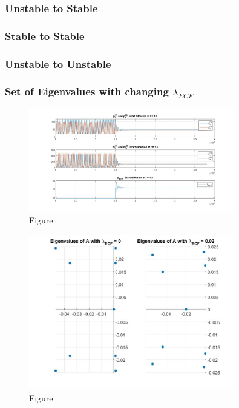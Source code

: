 \documentclass[12pt]{article}
\renewcommand{\(}{\left (}
\renewcommand{\)}{\right )}
\begin{document}
\subsubsection{Unstable to Stable}

\subsubsection{Stable to Stable}

\subsubsection{Unstable to Unstable}

\subsubsection{Set of Eigenvalues with changing $\lambda_{ECF}$}

\begin{figure}[ht]
    \centering
	\begin{minipage}{0.99\textwidth}
		\centering
		\includegraphics[width=0.8\textwidth]{US.jpg}
		\caption*{\small Figure}
	\end{minipage}
\end{figure}

\begin{figure}[ht]
    \centering
	\begin{minipage}{0.99\textwidth}
		\centering
		\includegraphics[width=0.8\textwidth]{USEi.jpg}
		\caption*{\small Figure}
	\end{minipage}
\end{figure}
\end{document}
